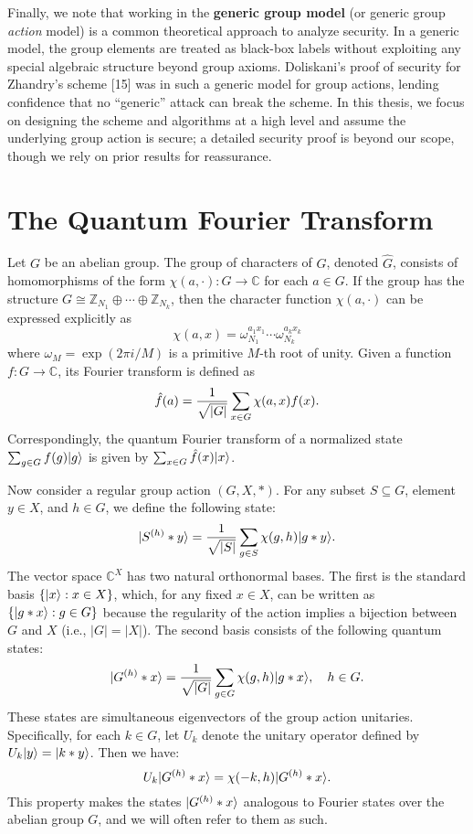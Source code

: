 \documentclass[12pt]{report}
\begin{document}
Finally, we note that working in the \textbf{generic group model} (or generic group \emph{action} model) is a common theoretical approach to analyze security. In a generic model, the group elements are treated as black-box labels without exploiting any special algebraic structure beyond group axioms. Doliskani’s proof of security for Zhandry’s scheme [15] was in such a generic model for group actions, lending confidence that no “generic” attack can break the scheme. In this thesis, we focus on designing the scheme and algorithms at a high level and assume the underlying group action is secure; a detailed security proof is beyond our scope, though we rely on prior results for reassurance.








\section{The Quantum Fourier Transform}
Let $G$ be an abelian group. The group of characters of $G$, denoted $\hat{G}$, consists of homomorphisms of the form $\chi(a, \cdot): G \to \mathbb{C}$ for each $a \in G$. If the group has the structure $G \cong \mathbb{Z}_{N_1} \oplus \cdots \oplus \mathbb{Z}_{N_k}$, then the character function $\chi(a, \cdot)$ can be expressed explicitly as
\[
\chi(a, x) = \omega_{N_1}^{a_1x_1} \cdots \omega_{N_k}^{a_kx_k}
\]
where $\omega_M = \exp(2\pi i / M)$ is a primitive $M$-th root of unity. Given a function $f: G \to \mathbb{C}$, its Fourier transform is defined as
\[
\hat{f}(a) = \frac{1}{\sqrt{\lvert G\rvert}} \sum_{x \in G} \chi(a, x) f(x).
\]
Correspondingly, the quantum Fourier transform of a normalized state $\sum_{g \in G} f(g) \lvert g\rangle$ is given by $\sum_{x \in G} \hat{f}(x) \lvert x\rangle$.

Now consider a regular group action $(G, X, *)$. For any subset $S \subseteq G$, element $y \in X$, and $h \in G$, we define the following state:
\begin{equation}
    \label{eq:x-fourier-basis}
    \lvert S^{(h)} * y\rangle = \frac{1}{\sqrt{\lvert S\rvert}} \sum_{g \in S} \chi(g, h) \lvert g * y\rangle.
\end{equation}
The vector space $\mathbb{C}^X$ has two natural orthonormal bases. The first is the standard basis $\{\lvert x\rangle : x \in X\}$, which, for any fixed $x \in X$, can be written as $\{\lvert g * x\rangle : g \in G\}$ because the regularity of the action implies a bijection between $G$ and $X$ (i.e., $|G| = |X|$). The second basis consists of the following quantum states:
\[
\lvert G^{(h)} * x\rangle = \frac{1}{\sqrt{\lvert G\rvert}} \sum_{g \in G} \chi(g, h) \lvert g * x\rangle, \quad h \in G.
\]
These states are simultaneous eigenvectors of the group action unitaries. Specifically, for each $k \in G$, let $U_k$ denote the unitary operator defined by $U_k \lvert y\rangle = \lvert k * y\rangle$. Then we have:
\[
U_k \lvert G^{(h)} * x\rangle = \chi(-k, h) \lvert G^{(h)} * x\rangle.
\]
This property makes the states $\lvert G^{(h)} * x\rangle$ analogous to Fourier states over the abelian group $G$, and we will often refer to them as such.
\end{document}
